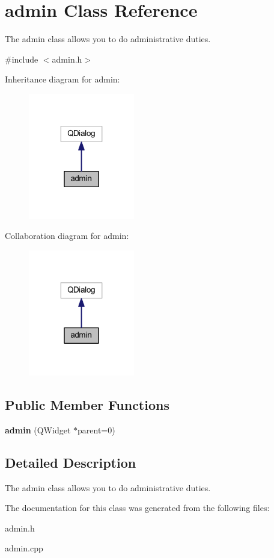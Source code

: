 \hypertarget{classadmin}{}\section{admin Class Reference}
\label{classadmin}


The admin class allows you to do administrative duties.  




{\ttfamily \#include $<$admin.\+h$>$}



Inheritance diagram for admin\+:
\nopagebreak
\begin{figure}[H]
\begin{center}
\leavevmode
\includegraphics[width=131pt]{classadmin__inherit__graph}
\end{center}
\end{figure}


Collaboration diagram for admin\+:
\nopagebreak
\begin{figure}[H]
\begin{center}
\leavevmode
\includegraphics[width=131pt]{classadmin__coll__graph}
\end{center}
\end{figure}
\subsection*{Public Member Functions}
\begin{DoxyCompactItemize}
\item 
\mbox{\label{classadmin_a6dcec2d7b1f0ccb693397a5a565aef77}} 
{\bfseries admin} (Q\+Widget $\ast$parent=0)
\end{DoxyCompactItemize}


\subsection{Detailed Description}
The admin class allows you to do administrative duties. 

The documentation for this class was generated from the following files\+:\begin{DoxyCompactItemize}
\item 
admin.\+h\item 
admin.\+cpp\end{DoxyCompactItemize}

